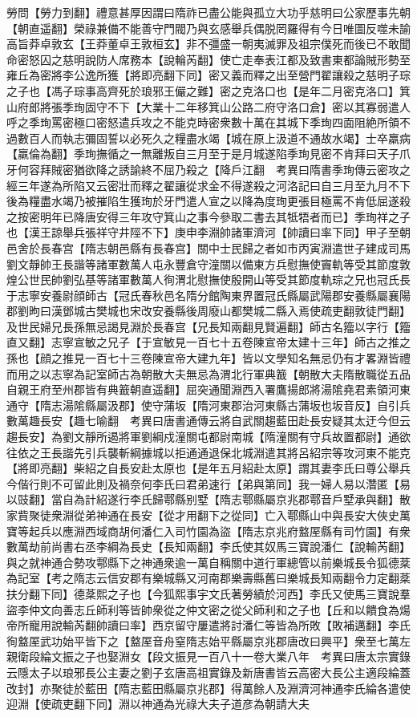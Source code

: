 勞問【勞力到翻】禮意甚厚因謂曰隋祚已盡公能與孤立大功乎慈明曰公家歷事先朝【朝直遥翻】榮祿兼備不能善守門閥乃與玄感舉兵偶脱罔羅得有今日唯圖反噬未諭高旨莽卓敦玄【王莽董卓王敦桓玄】非不彊盛一朝夷滅罪及祖宗僕死而後已不敢聞命密怒囚之慈明說防人席務本【說輪芮翻】使亡走奉表江都及致書東都論賊形勢至雍丘為密將李公逸所獲【將即亮翻下同】密又義而釋之出至營門翟讓殺之慈明子琮之子也【馮子琮事高齊死於琅邪王儼之難】密之克洛口也【是年二月密克洛口】箕山府郎將張季珣固守不下【大業十二年移箕山公路二府守洛口倉】密以其寡弱遣人呼之季珣罵密極口密怒遣兵攻之不能克時密衆數十萬在其城下季珣四面阻絶所領不過數百人而執志彌固誓以必死久之糧盡水竭【城在原上汲道不通故水竭】士卒羸病【羸倫為翻】季珣撫循之一無離叛自三月至于是月城遂陷季珣見密不肯拜曰天子爪牙何容拜賊密猶欲降之誘諭終不屈乃殺之【降戶江翻　考異曰隋書季珣傳云密攻之經三年遂為所陷又云密壯而釋之翟讓從求金不得遂殺之河洛記曰自三月至九月不下後為糧盡水竭乃被摧陷生獲珣於牙門遣人宣之以降為度珣更張目極罵不肯低屈遂殺之按密明年已降唐安得三年攻守箕山之事今參取二書去其牴牾者而已】季珣祥之子也【漢王諒舉兵張祥守井陘不下】庚申李淵帥諸軍濟河【帥讀曰率下同】甲子至朝邑舍於長春宫【隋志朝邑縣有長春宫】關中士民歸之者如市丙寅淵遣世子建成司馬劉文靜帥王長諧等諸軍數萬人屯永豐倉守潼關以備東方兵慰撫使竇軌等受其節度敦煌公世民帥劉弘基等諸軍數萬人徇渭北慰撫使殷開山等受其節度軌琮之兄也冠氏長于志寧安養尉顔師古【冠氏春秋邑名隋分館陶東界置冠氏縣屬武陽郡安養縣屬襄陽郡劉昫曰漢鄧城古樊城也宋改安養縣後周廢山都樊城二縣入焉使疏吏翻敦徒門翻】及世民婦兄長孫無忌謁見淵於長春宫【兄長知兩翻見賢遍翻】師古名籀以字行【籀直又翻】志寧宣敏之兄子【于宣敏見一百七十五卷陳宣帝太建十三年】師古之推之孫也【顔之推見一百七十三卷陳宣帝大建九年】皆以文學知名無忌仍有才畧淵皆禮而用之以志寧為記室師古為朝散大夫無忌為渭北行軍典籖【朝散大夫隋散職從五品自親王府至州郡皆有典籖朝直遥翻】屈突通聞淵西入署鷹揚郎將湯隂堯君素領河東通守【隋志湯隂縣屬汲郡】使守蒲坂【隋河東郡治河東縣古蒲坂也坂音反】自引兵數萬趣長安【趣七喻翻　考異曰唐書通傳云將自武關趨藍田赴長安疑其太迂今但云趨長安】為劉文靜所遏將軍劉綱戍潼關屯都尉南城【隋潼關有守兵故置都尉】通欲往依之王長諧先引兵襲斬綱據城以拒通通退保北城淵遣其將呂紹宗等攻河東不能克【將即亮翻】柴紹之自長安赴太原也【是年五月紹赴太原】謂其妻李氏曰尊公舉兵今偕行則不可留此則及禍奈何李氏曰君弟速行【弟與第同】我一婦人易以濳匿【易以豉翻】當自為計紹遂行李氏歸鄠縣别墅【隋志鄠縣屬京兆郡鄠音戶墅承與翻】散家貲聚徒衆淵從弟神通在長安【從才用翻下之從同】亡入鄠縣山中與長安大俠史萬寶等起兵以應淵西域商胡何潘仁入司竹園為盜【隋志京兆府盩厔縣有司竹園】有衆數萬劫前尚書右丞李綱為長史【長知兩翻】李氏使其奴馬三寶說潘仁【說輸芮翻】與之就神通合勢攻鄠縣下之神通衆逾一萬自稱關中道行軍總管以前樂城長令狐德棻為記室【考之隋志云信安郡有樂城縣又河南郡樂壽縣舊曰樂城長知兩翻令力定翻棻扶分翻下同】德棻熙之子也【今狐熙事宇文氏著勞績於河西】李氏又使馬三寶說羣盜李仲文向善志丘師利等皆帥衆從之仲文密之從父師利和之子也【丘和以饋食為煬帝所寵用說輸芮翻帥讀曰率】西京留守屢遣將討潘仁等皆為所敗【敗補邁翻】李氏徇盩厔武功始平皆下之【盩厔音舟窒隋志始平縣屬京兆郡唐改曰興平】衆至七萬左親衛段綸文振之子也娶淵女【段文振見一百八十一卷大業八年　考異曰唐太宗實錄云隱太子以琅邪長公主妻之劉子玄唐高祖實錄及新唐書皆云高密大長公主適段綸蓋改封】亦聚徒於藍田【隋志藍田縣屬京兆郡】得萬餘人及淵濟河神通李氏綸各遣使迎淵【使疏吏翻下同】淵以神通為光祿大夫子道彦為朝請大夫